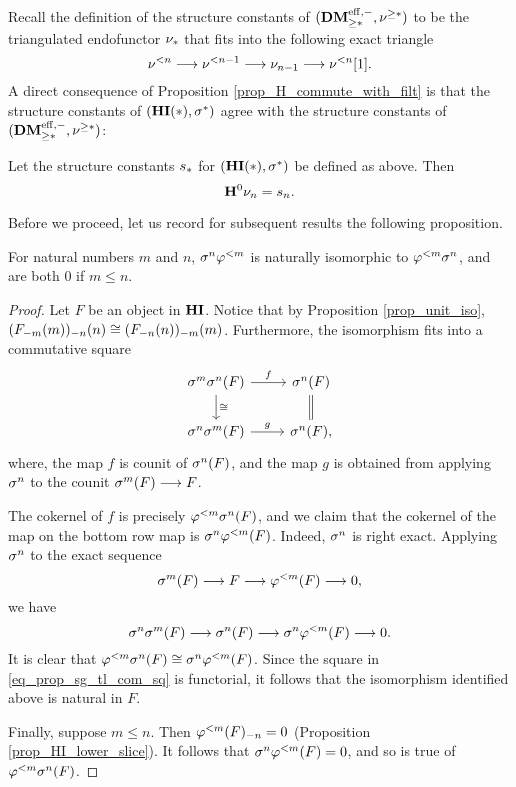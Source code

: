 Recall the definition of the structure constants of $(\GFiltDM{\DMeff}, 
\sgDM{*})$ to be the triangulated endofunctor $\sliceDM{*}$ that
fits into the following exact triangle
\[
\slDM{n} \to \slDM{n - 1} \to \sliceDM{n - 1} \to \slDM{n}[1].
\]
A direct consequence of Proposition \ref{prop_H_commute_with_filt} is 
that the structure constants of $(\LHI[*]{\HI}, \sgHI{*})$ agree 
with the structure constants of $(\GFiltDM{\DMeff}, \sgDM{*})$:

\begin{cor}\label{cor_H_commute_with_slice}
Let the structure constants $\slice{*}$ for $(\LHI[*]{\HI}, 
\sgHI{*})$ be defined as above. Then
\[
\HH^0 \sliceDM{n} = \slice{n}.
\]
\end{cor}

Before we proceed, let us record for subsequent results the 
following proposition.

\begin{prop}\label{prop_sg_tl_commute}
For natural numbers $m$ and $n$, $\sgHI{n} \tlHI{m}$ is naturally
isomorphic to $\tlHI{m} \sgHI{n}$, and are both 0 if $m \leq n$.
\end{prop}
\begin{proof}
Let $F$ be an object in $\HI$. Notice that by Proposition
\ref{prop_unit_iso}, $\LHI[n]{\RHI[n]{(\LHI[m]{\RHI[m]{F}})}} 
\cong \LHI[m]{\RHI[m]{(\LHI[n]{\RHI[n]{F}})}}$. Furthermore, the 
isomorphism fits into a commutative square
\begin{equation}\label{eq_prop_sg_tl_com_sq}
\begin{tikzcd}
\sgHI{m}\sgHI{n}(F) \arrow{r}{f} \arrow{d}{\cong} & 
\sgHI{n}(F) \arrow[equal]{d} \\
\sgHI{n}\sgHI{m}(F) \arrow{r}{g} &
\sgHI{n}(F),
\end{tikzcd}
\end{equation}
where, the map $f$ is counit of $\sgHI{n}(F)$, and the map $g$
is obtained from applying $\sgHI{n}$ to the counit $\sgHI{m}(F) 
\to F$.

The cokernel of $f$ is precisely $\tlHI{m} \sgHI{n}(F)$, and we 
claim that the cokernel of the map on the bottom row map is 
$\sgHI{n} \tlHI{m}(F)$. Indeed, $\sgHI{n}$ is right exact. Applying 
$\sgHI{n}$ to the exact sequence
\[
\sgHI{m}(F) \to F \to \tlHI{m}(F) \to 0,
\]
we have
\[
\sgHI{n} \sgHI{m}(F) \to \sgHI{n}(F) \to \sgHI{n} \tlHI{m}(F) \to 0.
\]
It is clear that $\tlHI{m} \sgHI{n}(F) \cong \sgHI{n} \tlHI{m}(F)$.
Since the square in \eqref{eq_prop_sg_tl_com_sq} is 
functorial, it follows that the isomorphism identified above is
natural in $F$.

Finally, suppose $m \leq n$. Then $\RHI[n]{\tlHI{m}(F)} = 0$
(Proposition \ref{prop_HI_lower_slice}). It follows that $\sgHI{n} 
\tlHI{m}(F) = 0$, and so is true of $\tlHI{m} \sgHI{n}(F)$.
\end{proof}

